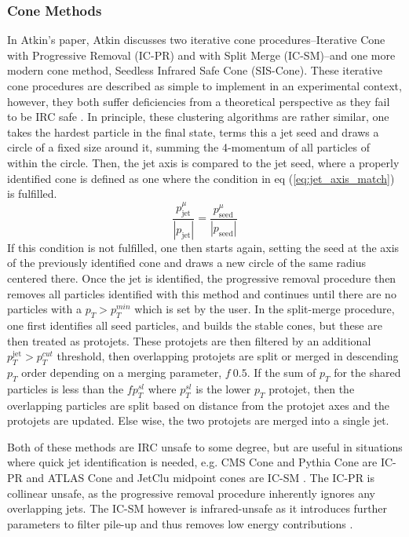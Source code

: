 \subsubsection{Cone Methods}
	In Atkin's paper, Atkin discusses two iterative cone procedures--Iterative Cone with Progressive Removal (IC-PR) and with Split Merge (IC-SM)--and one more modern cone method, Seedless Infrared Safe Cone (SIS-Cone). 
	These iterative cone procedures are described as simple to implement in an experimental context, however, they both suffer deficiencies from a theoretical perspective as they fail to be IRC safe \cite{Atkin2015} \cite{Salam2007}. 
	In principle, these clustering algorithms are rather similar, one takes the hardest particle in the final state, terms this a jet seed and draws a circle of a fixed size around it, summing the 4-momentum of all particles of within the circle.
	Then, the jet axis is compared to the jet seed, where a properly identified cone is defined as one where the condition in eq (\ref{eq:jet_axis_match}) is fulfilled.
	\begin{equation}
		\frac{p_{\textrm{jet}}^\mu}{|p_{\textrm{jet}}|} = \frac{p_{\textrm{seed}}^\mu}{|p_{\textrm{seed}}|}
		\label{eq:jet_axis_match}
	\end{equation}
	If this condition is not fulfilled, one then starts again, setting the seed at the axis of the previously identified cone and draws a new circle of the same radius centered there. 
	Once the jet is identified, the progressive removal procedure then removes all particles identified with this method and continues until there are no particles with a $p_{T} > p_{T}^{min}$ which is set by the user. 
	In the split-merge procedure, one first identifies all seed particles, and builds the stable cones, but these are then treated as protojets. 
	These protojets are then filtered by an additional $p_{T}^{\textrm{jet}} > p_{T}^{cut}$ threshold, then overlapping protojets are split or merged in descending $p_{T}$ order depending on a merging parameter, $f ~ 0.5$. 
	If the sum of $p_{T}$ for the shared particles is less than the $f p_{T}^{sl}$ where $p_{T}^{sl}$ is the lower $p_{T}$ protojet, then the overlapping particles are split based on distance from the protojet axes and the protojets are updated.
	Else wise, the two protojets are merged into a single jet. 

	Both of these methods are IRC unsafe to some degree, but are useful in situations where quick jet identification is needed, e.g. CMS Cone and Pythia Cone are IC-PR and ATLAS Cone and JetClu midpoint cones are IC-SM . %
	The IC-PR is collinear unsafe, as the progressive removal procedure inherently ignores any overlapping jets.
	The IC-SM however is infrared-unsafe as it introduces further parameters to filter pile-up and thus removes low energy contributions \cite{Salam2007}.
